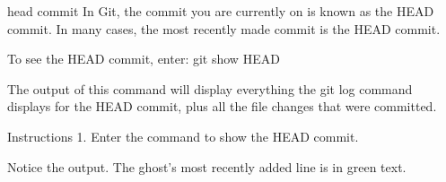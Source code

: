head commit
    In Git, the commit you are currently on is known as the HEAD commit. In many cases, the most recently made commit is the HEAD commit.

    To see the HEAD commit, enter:
        git show HEAD
    
    The output of this command will display everything the git log command displays for the HEAD commit, plus all the file changes that were committed.

Instructions
    1.
    Enter the command to show the HEAD commit.

    Notice the output. The ghost’s most recently added line is in green text.